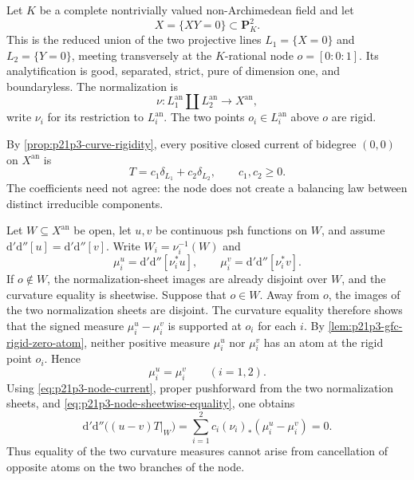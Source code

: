 
\begin{example}
\label{ex:p21p3-reducible-node-bt}
Let \(K\) be a complete nontrivially valued non-Archimedean field and let
\[
                 X=\{XY=0\}\subset\mathbf P^2_K.
\]
This is the reduced union of the two projective lines
\(L_1=\{X=0\}\) and \(L_2=\{Y=0\}\), meeting transversely at the
\(K\)-rational node \(o=[0:0:1]\).  Its analytification is good, separated,
strict, pure of dimension one, and boundaryless.  The normalization is
\[
 \nu:L_1^{\mathrm{an}}\amalg L_2^{\mathrm{an}}
          \longrightarrow X^{\mathrm{an}},
\]
write \(\nu_i\) for its restriction to \(L_i^{\mathrm{an}}\).  The two
points \(o_i\in L_i^{\mathrm{an}}\) above \(o\) are rigid.

By \cref{prop:p21p3-curve-rigidity}, every positive closed current of
bidegree \((0,0)\) on \(X^{\mathrm{an}}\) is
\begin{equation}
                         T=c_1\delta_{L_1}+c_2\delta_{L_2},
                         \qquad c_1,c_2\geq0.
 \label{eq:p21p3-node-current}
\end{equation}
The coefficients need not agree: the node does not create a balancing law
between distinct irreducible components.

Let \(W\subseteq X^{\mathrm{an}}\) be open, let \(u,v\) be continuous psh
functions on \(W\), and assume
\(
 \mathrm d'\mathrm d''[u]=\mathrm d'\mathrm d''[v].
\)
Write \(W_i=\nu_i^{-1}(W)\) and
\[
 \mu_i^u=\mathrm d'\mathrm d''[\nu_i^*u],
 \qquad
 \mu_i^v=\mathrm d'\mathrm d''[\nu_i^*v].
\]
If \(o\notin W\), the normalization-sheet images are already disjoint over
\(W\), and the curvature equality is sheetwise.  Suppose that \(o\in W\).
Away from \(o\), the images of the two normalization sheets are disjoint.
The curvature equality therefore shows that the signed measure
\(\mu_i^u-\mu_i^v\) is supported at \(o_i\) for each \(i\).  By
\cref{lem:p21p3-gfc-rigid-zero-atom}, neither positive measure
\(\mu_i^u\) nor \(\mu_i^v\) has an atom at the rigid point \(o_i\).  Hence
\begin{equation}
                              \mu_i^u=\mu_i^v
                              \qquad(i=1,2).
 \label{eq:p21p3-node-sheetwise-equality}
\end{equation}
Using \eqref{eq:p21p3-node-current}, proper pushforward from the two
normalization sheets, and \eqref{eq:p21p3-node-sheetwise-equality}, one
obtains
\[
 \mathrm d'\mathrm d''\bigl((u-v)T|_W\bigr)
   =\sum_{i=1}^2c_i(\nu_i)_*(\mu_i^u-\mu_i^v)=0.
\]
Thus equality of the two curvature measures cannot arise from cancellation
of opposite atoms on the two branches of the node.


\end{example}
